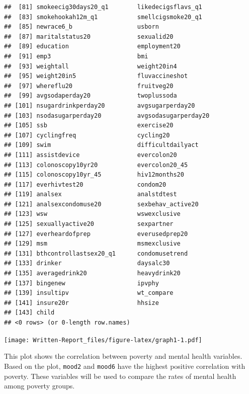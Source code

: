 \documentclass[
]{article}
\begin{document}
\begin{verbatim}
##  [81] smokeecig30days20_q1        likedecigsflavs_q1         
##  [83] smokehookah12m_q1           smellcigsmoke20_q1         
##  [85] newrace6_b                  usborn                     
##  [87] maritalstatus20             sexualid20                 
##  [89] education                   employment20               
##  [91] emp3                        bmi                        
##  [93] weightall                   weight20in4                
##  [95] weight20in5                 fluvaccineshot             
##  [97] whereflu20                  fruitveg20                 
##  [99] avgsodaperday20             twoplussoda                
## [101] nsugardrinkperday20         avgsugarperday20           
## [103] nsodasugarperday20          avgsodasugarperday20       
## [105] ssb                         exercise20                 
## [107] cyclingfreq                 cycling20                  
## [109] swim                        difficultdailyact          
## [111] assistdevice                evercolon20                
## [113] colonoscopy10yr20           evercolon20_45             
## [115] colonoscopy10yr_45          hiv12months20              
## [117] everhivtest20               condom20                   
## [119] analsex                     analstdtest                
## [121] analsexcondomuse20          sexbehav_active20          
## [123] wsw                         wswexclusive               
## [125] sexuallyactive20            sexpartner                 
## [127] everheardofprep             everusedprep20             
## [129] msm                         msmexclusive               
## [131] bthcontrollastsex20_q1      condomusetrend             
## [133] drinker                     daysalc30                  
## [135] averagedrink20              heavydrink20               
## [137] bingenew                    ipvphy                     
## [139] insultipv                   wt_compare                 
## [141] insure20r                   hhsize                     
## [143] child                      
## <0 rows> (or 0-length row.names)
\end{verbatim}

\texttt{[image: Written-Report\_files/figure-latex/graph1-1.pdf]}

This plot shows the correlation between poverty and mental health
variables. Based on the plot, \texttt{mood2} and \texttt{mood6} have the
highest positive correlation with poverty. These variables will be used
to compare the rates of mental health among poverty groups.
\end{document}

